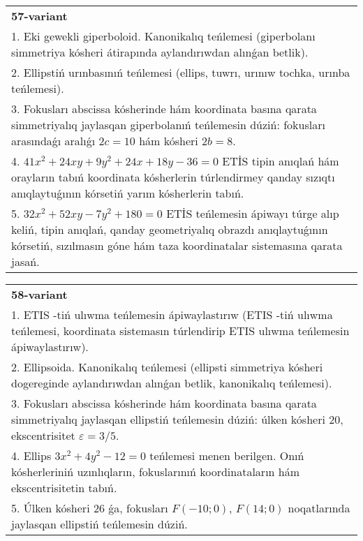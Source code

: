 \documentclass{article}
\begin{document}
\begin{tabular}{m{17cm}}
\textbf{57-variant}\\
1. Eki gewekli giperboloid. Kanonikalıq teńlemesi (giperbolanı simmetriya kósheri átirapında aylandırıwdan alınǵan betlik).\\

2. Ellipstiń urınbasınıń teńlemesi (ellips, tuwrı, urınıw tochka, urınba teńlemesi).\\

3. Fokusları abscissa kósherinde hám koordinata basına qarata simmetriyalıq jaylasqan giperbolanıń teńlemesin dúziń: fokusları arasındaǵı aralıǵı $2 c=10$ hám kósheri $2 b=8$.\\

4. $41x^{2} + 24xy + 9y^{2} + 24x + 18y - 36 = 0$ ETİS tipin anıqlań hám orayların tabıń koordinata kósherlerin túrlendirmey qanday sızıqtı anıqlaytuǵının kórsetiń yarım kósherlerin tabıń.  \\

5. $32x^{2} + 52xy - 7y^{2} + 180 = 0$ ETİS teńlemesin ápiwayı túrge alıp keliń, tipin anıqlań, qanday geometriyalıq obrazdı anıqlaytuǵının kórsetiń, sızılmasın góne hám taza koordinatalar sistemasına qarata jasań.  
\end{tabular}
\vspace{1cm}


\begin{tabular}{m{17cm}}
\textbf{58-variant}\\
1. ETIS -tiń ulıwma teńlemesin ápiwaylastırıw (ETIS -tiń ulıwma teńlemesi, koordinata sistemasın túrlendirip ETIS ulıwma teńlemesin ápiwaylastırıw).\\

2. Ellipsoida. Kanonikalıq teńlemesi (ellipsti simmetriya kósheri dogereginde aylandırıwdan alınǵan betlik, kanonikalıq teńlemesi).\\

3. Fokusları abscissa kósherinde hám koordinata basına qarata simmetriyalıq jaylasqan ellipstiń teńlemesin dúziń: úlken kósheri $20$, ekscentrisitet $\varepsilon=3/5$.\\

4. Ellips $3x^{2} + 4y^{2} - 12 = 0$ teńlemesi menen berilgen. Onıń kósherleriniń uzınlıqların, fokuslarınıń koordinataların hám ekscentrisitetin tabıń.  \\

5. Úlken kósheri 26 ǵa, fokusları $F( - 10;0)$, $F(14;0)$ noqatlarında jaylasqan ellipstiń teńlemesin dúziń.  
\end{tabular}
\vspace{1cm}
\end{document}
